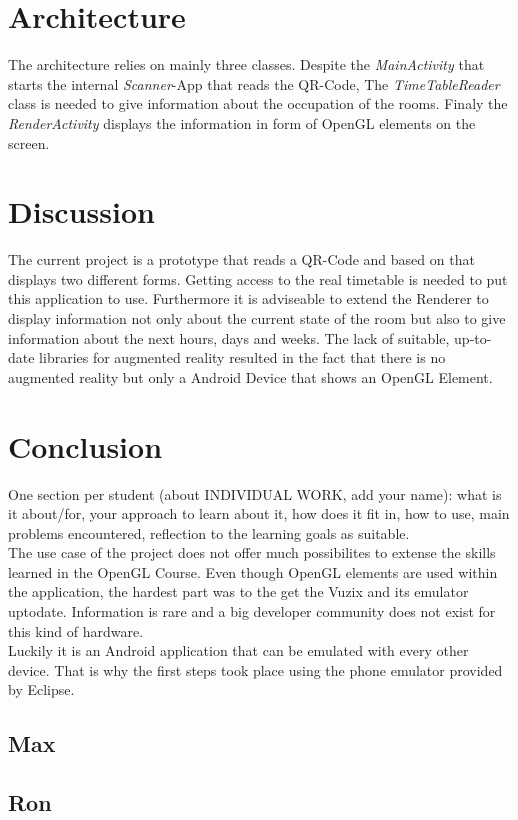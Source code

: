 \documentclass[]{article}
\begin{document}
\begin{multicols}{2}
\section{Architecture}
The architecture relies on mainly three classes. Despite the \emph{MainActivity} that starts the internal \emph{Scanner}-App that reads the QR-Code, The \emph{TimeTableReader} class is needed to give information about the occupation of the rooms. Finaly the \emph{RenderActivity} displays the information in form of OpenGL elements on the screen.   
\section{Discussion}
The current project is a prototype that reads a QR-Code and based on that displays two different forms. Getting access to the real timetable is needed to put this application to use. Furthermore it is adviseable to extend the Renderer to display information not only about the current state of the room but also to give information about the next hours, days and weeks.\newline
The lack of suitable, up-to-date libraries for augmented reality resulted in the fact that there is no augmented reality but only a Android Device that shows an OpenGL Element.  
\section{Conclusion}
One section per student (about INDIVIDUAL WORK, add your name): what is it about/for,
your approach to learn about it, how does it fit in, how to use, main problems encountered,
reflection to the learning goals as suitable.\\
The use case of the project does not offer much possibilites to extense the skills learned in the OpenGL Course. Even though OpenGL elements are used within the application, the hardest part was to the get the Vuzix and its emulator uptodate. Information is rare and a big developer community does not exist for this kind of hardware. \\
Luckily it is an Android application that can be emulated with every other device. That is why the first steps took place using the phone emulator provided by Eclipse. \\
\subsection{Max}
 
\subsection{Ron}
\end{multicols}
\end{document}
